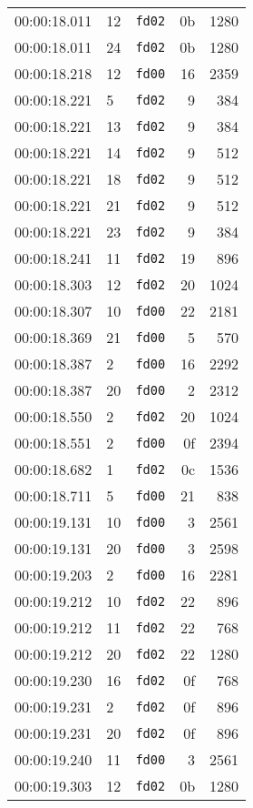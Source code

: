 \documentclass{article}
\begin{document}
\begin{longtable}{lllrr}
00:00:18.011 & 12 & \texttt{fd02} & 0b & 1280 \\
00:00:18.011 & 24 & \texttt{fd02} & 0b & 1280 \\
00:00:18.218 & 12 & \texttt{fd00} & 16 & 2359 \\
00:00:18.221 & 5 & \texttt{fd02} & 9 & 384 \\
00:00:18.221 & 13 & \texttt{fd02} & 9 & 384 \\
00:00:18.221 & 14 & \texttt{fd02} & 9 & 512 \\
00:00:18.221 & 18 & \texttt{fd02} & 9 & 512 \\
00:00:18.221 & 21 & \texttt{fd02} & 9 & 512 \\
00:00:18.221 & 23 & \texttt{fd02} & 9 & 384 \\
00:00:18.241 & 11 & \texttt{fd02} & 19 & 896 \\
00:00:18.303 & 12 & \texttt{fd02} & 20 & 1024 \\
00:00:18.307 & 10 & \texttt{fd00} & 22 & 2181 \\
00:00:18.369 & 21 & \texttt{fd00} & 5 & 570 \\
00:00:18.387 & 2 & \texttt{fd00} & 16 & 2292 \\
00:00:18.387 & 20 & \texttt{fd00} & 2 & 2312 \\
00:00:18.550 & 2 & \texttt{fd02} & 20 & 1024 \\
00:00:18.551 & 2 & \texttt{fd00} & 0f & 2394 \\
00:00:18.682 & 1 & \texttt{fd02} & 0c & 1536 \\
00:00:18.711 & 5 & \texttt{fd00} & 21 & 838 \\
00:00:19.131 & 10 & \texttt{fd00} & 3 & 2561 \\
00:00:19.131 & 20 & \texttt{fd00} & 3 & 2598 \\
00:00:19.203 & 2 & \texttt{fd00} & 16 & 2281 \\
00:00:19.212 & 10 & \texttt{fd02} & 22 & 896 \\
00:00:19.212 & 11 & \texttt{fd02} & 22 & 768 \\
00:00:19.212 & 20 & \texttt{fd02} & 22 & 1280 \\
00:00:19.230 & 16 & \texttt{fd02} & 0f & 768 \\
00:00:19.231 & 2 & \texttt{fd02} & 0f & 896 \\
00:00:19.231 & 20 & \texttt{fd02} & 0f & 896 \\
00:00:19.240 & 11 & \texttt{fd00} & 3 & 2561 \\
00:00:19.303 & 12 & \texttt{fd02} & 0b & 1280 \\

\end{longtable}
\end{document}
